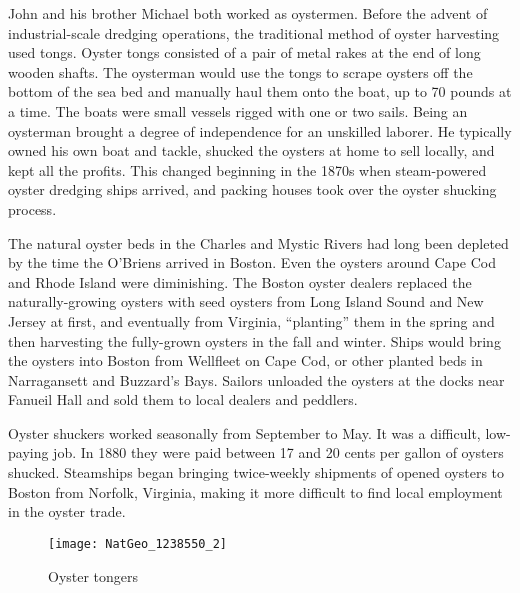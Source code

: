 John and his brother Michael both worked as oystermen.\cite{EdwardFrancis3OBrienBirth:1,Michael2OBrien1886:1,1861John2OBrien:1} Before the advent of industrial-scale dredging operations, the traditional method of oyster harvesting used tongs. Oyster tongs consisted of a pair of metal rakes at the end of long wooden shafts. The oysterman would use the tongs to scrape oysters off the bottom of the sea bed and manually haul them onto the boat, up to 70 pounds at a time. The boats were small vessels rigged with one or two sails.\cite{Botwick:95} Being an oysterman brought a degree of independence for an unskilled laborer. He typically owned his own boat and tackle, shucked the oysters at home to sell locally, and kept all the profits.\cite{MacKenzie:7:1, Botwick:96} This changed beginning in the 1870s when steam-powered oyster dredging ships arrived, and packing houses took over the oyster shucking process.\cite{MacKenzie:5, MacKenzie:7:2} 

The natural oyster beds in the Charles and Mystic Rivers had long been depleted by the time the O'Briens arrived in Boston. Even the oysters around Cape Cod and Rhode Island were diminishing. The Boston oyster dealers replaced the naturally-growing oysters with seed oysters from Long Island Sound and New Jersey at first, and eventually from Virginia, ``planting'' them in the spring and then harvesting the fully-grown oysters in the fall and winter. Ships would bring the oysters into Boston from Wellfleet on Cape Cod, or other planted beds in Narragansett and Buzzard's Bays. Sailors unloaded the oysters at the docks near Fanueil Hall and sold them to local dealers and peddlers.\cite{Ingersoll:27-28} 

Oyster shuckers worked seasonally from September to May. It was a difficult, low-paying job. In 1880 they were paid between 17 and 20 cents per gallon of oysters shucked. Steamships began bringing twice-weekly shipments of opened oysters to Boston from Norfolk, Virginia, making it more difficult to find local employment in the oyster trade.\cite{Ingersoll:30}

\begin{figure}[htbp]
	\centering
	\texttt{[image: NatGeo\_1238550\_2]}
	\caption{Oyster tongers}
	\label{fig:OysterTongers}
\end{figure}


